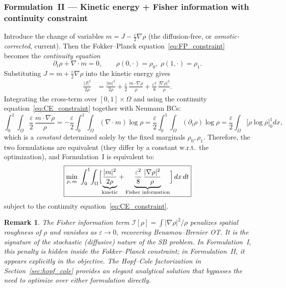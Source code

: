 \documentclass[11pt,a4paper]{article}
\newtheorem{remark}[theorem]{Remark}
\newcommand{\eps}{\varepsilon}
\begin{document}
\subsubsection*{Formulation~II — Kinetic energy + Fisher information with continuity constraint}

Introduce the change of variables $m = J - \tfrac\eps 2\nabla\rho$
(the diffusion-free, or \emph{osmotic-corrected}, current).
Then the Fokker--Planck equation~\eqref{eq:FP_constraint} becomes the
\emph{continuity equation}
\begin{equation}\label{eq:CE_constraint}
  \partial_t\rho + \nabla\cdot m = 0,
  \qquad
  \rho(0,\cdot)=\rho_0,\;\rho(1,\cdot)=\rho_1.
\end{equation}
Substituting $J = m + \tfrac\eps 2\nabla\rho$ into the kinetic energy gives
\begin{align}
  \frac{|J|^2}{2\rho}
    &= \frac{|m|^2}{2\rho}
     + \frac\eps 2\,\frac{m\cdot\nabla\rho}{\rho}
     + \frac{\eps^2}{8}\,\frac{|\nabla\rho|^2}{\rho}.
\end{align}
Integrating the cross-term over $[0,1]\times\Omega$ and using the
continuity equation~\eqref{eq:CE_constraint} together with Neumann BCs:
\begin{equation}
  \int_0^1\!\int_\Omega \frac\eps 2\,\frac{m\cdot\nabla\rho}{\rho}
  = -\frac\eps 2\int_0^1\!\int_\Omega (\nabla\cdot m)\log\rho
  = \frac\eps 2\int_0^1\!\int_\Omega (\partial_t\rho)\log\rho
  = \frac\eps 2\!\int_\Omega\bigl[\rho\log\rho\bigr]_0^1 dx,
\end{equation}
which is a \emph{constant} determined solely by the fixed marginals
$\rho_0, \rho_1$.
Therefore, the two formulations are equivalent (they differ by a constant
w.r.t.\ the optimization), and Formulation~I is equivalent to:
\begin{equation}\label{eq:SB_Fisher}
  \boxed{
  \min_{\rho,\,m}\;
  \int_0^1\!\int_\Omega
    \Bigl[\underbrace{\frac{|m|^2}{2\rho}}_{\text{kinetic}}
    + \underbrace{\frac{\eps^2}{8}\,\frac{|\nabla\rho|^2}{\rho}}_{\text{Fisher information}}\Bigr]
    \,dx\,dt
  }
\end{equation}
subject to the continuity equation~\eqref{eq:CE_constraint}.

\begin{remark}
The \emph{Fisher information} term $\mathcal{I}[\rho] = \int|\nabla\rho|^2/\rho$
penalizes spatial roughness of $\rho$ and vanishes as $\eps\to 0$,
recovering Benamou--Brenier OT.
It is the signature of the stochastic (diffusive) nature of the SB problem.
In Formulation~I, this penalty is hidden inside the Fokker--Planck
constraint; in Formulation~II, it appears explicitly in the objective.
The Hopf--Cole factorization in Section~\ref{sec:hopf_cole} provides an
elegant analytical solution that bypasses the need to optimize over
either formulation directly.
\end{remark}
\end{document}
